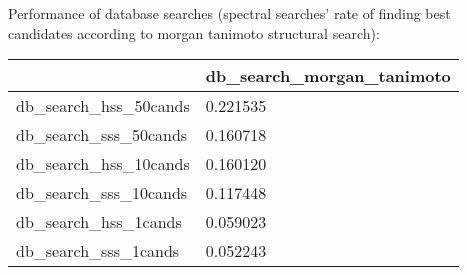 Performance of database searches (spectral searches' rate of finding best candidates according to morgan tanimoto structural search):
\begin{tabular}{ll}
\toprule
 & db_search_morgan_tanimoto \\
\midrule
db_search_hss_50cands & 0.221535 \\
db_search_sss_50cands & 0.160718 \\
db_search_hss_10cands & 0.160120 \\
db_search_sss_10cands & 0.117448 \\
db_search_hss_1cands & 0.059023 \\
db_search_sss_1cands & 0.052243 \\
\bottomrule
\end{tabular}
